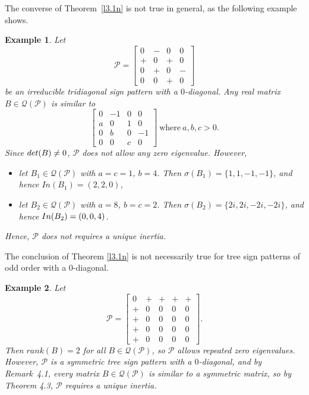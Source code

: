 \documentclass[10pt,a4paper]{amsart}
\newtheorem{eg}{Example}[section]
\numberwithin{equation}{section}
\def\det{{\rm det}}
\def\In{{\rm In}}
\begin{document}
	The converse of Theorem~\ref{l3.1n} is not true in general, as the following example shows.
	\begin{eg} Let $$\mathcal{P}=\begin{bmatrix}
			0&-&0&0\\ +&0&+&0\\ 0&+&0&-\\ 0&0&+&0
		\end{bmatrix}$$ be an irreducible tridiagonal sign pattern with a $0$-diagonal. Any real matrix $B\in \mathcal{Q}(\mathcal{P})$ is similar to	$$\begin{bmatrix}
			0&-1&0&0\\ a&0&1&0\\ 0&b&0&-1\\ 0&0&c&0
		\end{bmatrix}~\text{where} ~a,b,c>0.$$ Since $\det(B)\neq 0$, $\mathcal{P}$ does not allow any zero eigenvalue. However,
		\begin{itemize}
			\item[i.] let $B_1 \in \mathcal{Q}(\mathcal{P})$ with $a=c=1$, $b=4$. Then $\sigma(B_1)=\{1, 1, -1,-1\}$, and hence $In(B_1)=(2,2,0)$,
			\item[ii.] let $B_2 \in \mathcal{Q}(\mathcal{P})$ with $a=8$, $b=c=2$. Then $\sigma(B_2)=\{2i,2i, -2i,  -2i\}$, and hence $\In(B_2) = (0, 0, 4)$.
		\end{itemize} Hence, $\mathcal{P}$ does not requires a unique inertia.
	\end{eg}
	
	
	
	The conclusion of Theorem \ref{l3.1n} is not necessarily true for tree sign patterns of odd order with a $0$-diagonal.
	\begin{eg}
		Let $$\mathcal{P}=\begin{bmatrix}
			0&+&+&+&+\\+&0&0&0&0\\+&0&0&0&0\\+&0&0&0&0\\+&0&0&0&0
		\end{bmatrix}.$$ Then $rank(B)=2$ for all $B\in \mathcal{Q}(\mathcal{P})$, so $\mathcal{P}$ allows repeated zero eigenvalues. However, $\mathcal{P}$ is a symmetric tree sign pattern with a $0$-diagonal, and by Remark~4.1\cite{2018}, every matrix $B\in\mathcal{Q}(\mathcal{P})$ is similar to a symmetric matrix, so by Theorem 4.3\cite{2001}, $\mathcal{P}$ requires a unique inertia.
	\end{eg}
	
\end{document}
